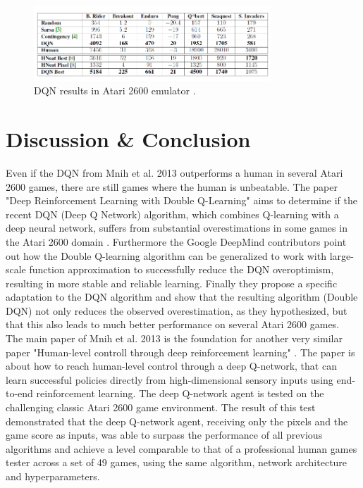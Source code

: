 \documentclass[conference]{IEEEtran}
\begin{document}
\begin{figure}[!t]
\centering
\includegraphics[width=3.5in]{result_table_dqn}
\caption{DQN results in Atari 2600 emulator \cite{mnih-atari-2013}.}
\label{fig:result_table_dqn}
\end{figure}

\section{Discussion \& Conclusion}
Even if the DQN from Mnih et al. 2013 outperforms a human in several Atari 2600 games, there are still games where the human is unbeatable. The paper "Deep Reinforcement Learning with Double Q-Learning" aims to determine if the recent DQN (Deep Q Network) algorithm, which combines Q-learning with a deep neural network, suffers from substantial overestimations in some games in the Atari 2600 domain \cite{DBLP:journals/corr/HasseltGS15}. Furthermore the Google DeepMind contributors point out how the Double Q-learning algorithm can be generalized to work with large-scale function approximation to successfully reduce the DQN overoptimism, resulting in more stable and reliable learning. Finally they propose a specific adaptation to the DQN algorithm and show that the resulting algorithm (Double DQN) not only reduces the observed overestimation, as they hypothesized, but that this also leads to much better performance on several Atari 2600 games. \\

The main paper of Mnih et al. 2013 \cite{mnih-atari-2013} is the foundation for another very similar paper "Human-level controll through deep reinforcement learning" \cite{DRL:HumanLevelControl}. The paper is about how to reach human-level control through a deep Q-network, that can learn successful policies directly from high-dimensional sensory inputs using end-to-end reinforcement learning. The deep Q-network agent is tested on the challenging classic Atari 2600 game environment. The result of this test demonstrated that the deep Q-network agent, receiving only the pixels and the game score as inputs, was able to surpass the performance of all previous algorithms and achieve a level comparable to that of a professional human games tester across a set of 49 games, using the same algorithm, network architecture and hyperparameters. \\
\end{document}

